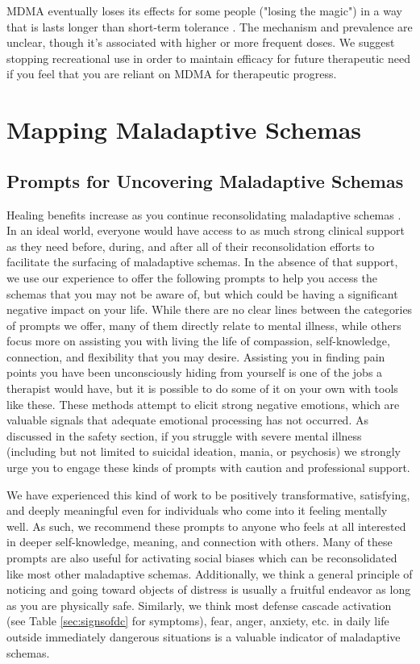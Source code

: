 \documentclass[12pt,letterpaper]{book}
\begin{document}
MDMA eventually loses its effects for some people ("losing the magic") in a way that is lasts longer than short-term tolerance \cite{farreTolerance,parrottTolerance}. The mechanism and prevalence are unclear, though it's associated with higher or more frequent doses. We suggest stopping recreational use in order to maintain efficacy for future therapeutic need if you feel that you are reliant on MDMA for therapeutic progress.
\chapter{Mapping Maladaptive Schemas}
\label{mapping}
\section{Prompts for Uncovering Maladaptive Schemas}
\label{uncovering}
Healing benefits increase as you continue reconsolidating maladaptive schemas \cite{eckerUnlocking}. In an ideal world, everyone would have access to as much strong clinical support as they need before, during, and after all of their reconsolidation efforts to facilitate the surfacing of maladaptive schemas. In the absence of that support, we use our experience to offer the following prompts to help you access the schemas that you may not be aware of, but which could be having a significant negative impact on your life. While there are no clear lines between the categories of prompts we offer, many of them directly relate to mental illness, while others focus more on assisting you with living the life of compassion, self-knowledge, connection, and flexibility that you may desire. Assisting you in finding pain points you have been unconsciously hiding from yourself is one of the jobs a therapist would have, but it is possible to do some of it on your own with tools like these. These methods attempt to elicit strong negative emotions, which are valuable signals that adequate emotional processing has not occurred. As discussed in the safety section, if you struggle with severe mental illness (including but not limited to suicidal ideation, mania, or psychosis) we strongly urge you to engage these kinds of prompts with caution and professional support.

We have experienced this kind of work to be positively transformative, satisfying, and deeply meaningful even for individuals who come into it feeling mentally well. As such, we recommend these prompts to anyone who feels at all interested in deeper self-knowledge, meaning, and connection with others. Many of these prompts are also useful for activating social biases which can be reconsolidated like most other maladaptive schemas. Additionally, we think a general principle of noticing and going toward objects of distress is usually a fruitful endeavor as long as you are physically safe. Similarly, we think most defense cascade activation (see Table \ref{sec:signsofdc} for symptoms), fear, anger, anxiety, etc. in daily life outside immediately dangerous situations is a valuable indicator of maladaptive schemas.
\end{document}
